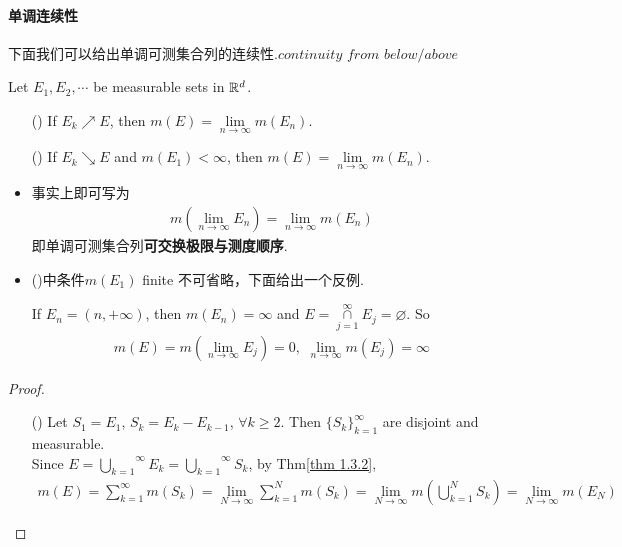 \paragraph{单调连续性}
	下面我们可以给出单调可测集合列的连续性.$continuity \,\, from \,\, below / above$
	\begin{thm}\label{thm 1.3.3}
		Let $E_1 , E_2 , \cdots$ be measurable sets in $\mathbb{R}^d$.
		\begin{enumerate}
			\item[(\rmnum{1})]If $E_k \nearrow E$, then $m(E) = \underset{n \to \infty}{\lim}{m(E_n)}$.
			
			\item[(\rmnum{2})]If $E_k \searrow E$ and $m(E_1) < \infty$, then $m(E) = \underset{n \to \infty}{\lim}{m(E_n)}$.
		\end{enumerate}
	
		\begin{rmk}
			\begin{itemize}
				\item 事实上即可写为
				\begin{align}
					m(\lim_{n \to \infty}{E_n}) = \lim_{n \to \infty}{m(E_n)}
				\end{align}
				即单调可测集合列\textbf{可交换极限与测度顺序}.
				
				\item ()中条件$m(E_1)$ finite 不可省略，下面给出一个反例.
				\begin{example}
					If $E_n = (n , +\infty)$, then $m(E_n) = \infty$ and $E = \overset{\infty}{\underset{j = 1}{\cap}}{E_j} = \varnothing$. So
					\begin{align}
						m(E) = m(\lim_{n \to \infty}{E_j}) = 0 , \,\, \lim_{n \to \infty}{m(E_j)} = \infty
					\end{align}
				\end{example}
			\end{itemize}
			
		\end{rmk}
		
		\begin{proof}
			\begin{enumerate}
				\item[(\rmnum{1})]Let $S_1 = E_1$, $S_k = E_k - E_{k - 1}$, $\forall k \geq 2$. Then $\{ S_k \}_{k = 1}^{\infty}$ are disjoint and measurable.\\
				Since $E = \overset{\infty}{\underset{k = 1}{\bigcup}}{E_k} = \overset{\infty}{\underset{k = 1}{\bigcup}}{S_k}$, by Thm\ref{thm 1.3.2},
				\begin{align}
					m(E) = \sum_{k = 1}^{\infty}{m(S_k)} = \lim_{N \to \infty}{\sum_{k = 1}^{N}{m(S_k)}} = \lim_{N \to \infty}{m(\bigcup_{k = 1}^{N}{S_k})} = \lim_{N \to \infty}{m(E_N)}
				\end{align}
			

\end{enumerate}
\end{proof}
\end{thm}
